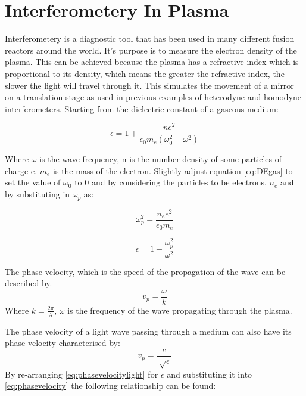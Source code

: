 \documentclass[12pt,a4paper,oneside]{report}
\begin{document}
    \section{Interferometery In Plasma}
Interferometery is a diagnostic tool that has been used in many different fusion reactors around the world. It's purpose is to measure the electron density of the plasma. This can be achieved because the plasma has a refractive index which is proportional to its density, which means the greater the refractive index, the slower the light will travel through it. This simulates the movement of a mirror on a translation stage as used in previous examples of heterodyne and homodyne interferometers. Starting from the dielectric constant of a gaseous medium:

\begin{equation}
\epsilon = 1 + \frac{ne^{2}}{\epsilon _{0} m_{e} (\omega _{0}^{2} - \omega ^{2})}
	\label{eq:DEgas}
\end{equation}

Where $\omega$ is the wave frequency, n is the number density of some particles of charge e. $m_{e}$ is the mass of the electron.
Slightly adjust equation \ref{eq:DEgas} to set the value of $\omega_{0}$ to 0 and by considering the particles to be electrons, $n_{e}$ and by substituting in $\omega _{p}$ as:

\begin{equation}
\omega _{p}^{2} = \frac{n_{e}e^{2}}{\epsilon _{0} m_{e}}
	\label{eq:plasmafrequency}
\end{equation}

\begin{equation}
\epsilon = 1 - \frac{\omega _{p}^{2}}{\omega ^{2}}
	\label{eq:DEgas}
\end{equation}

The phase velocity, which is the speed of the propagation of the wave can be described by.
\begin{equation}
v_{p} = \frac{\omega}{k}
	\label{eq:phasevelocity}
\end{equation}
Where $k = \frac{2\pi}{\lambda}$, $\omega$ is the frequency of the wave propagating through the plasma.

The phase velocity of a light wave passing through a medium can also have its phase velocity characterised by:
\begin{equation}
v_{p} = \frac{c}{\sqrt[]{\epsilon}}
	\label{eq:phasevelocitylight}
\end{equation}
By re-arranging \ref{eq:phasevelocitylight} for $\epsilon$ and substituting it into \ref{eq:phasevelocity} the following relationship can be found:
\end{document}
